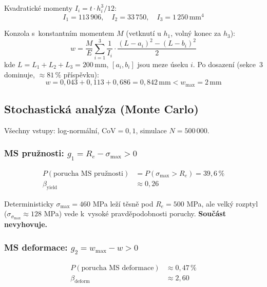 \documentclass[a4paper,11pt]{article}
\newcommand{\unit}[1]{\,\mathrm{#1}}
\begin{document}
Kvadratické momenty $I_i = t \cdot h_i^3 / 12$:
\begin{equation}
    I_1 = 113\,906, \quad I_2 = 33\,750, \quad I_3 = 1\,250\unit{mm^4}
\end{equation}

Konzola s~konstantním momentem $M$ (vetknutí u $h_1$, volný konec za $h_3$):
\begin{equation}
    w = \frac{M}{E} \sum_{i=1}^{3} \frac{1}{I_i} \cdot \frac{(L - a_i)^2 - (L - b_i)^2}{2}
\end{equation}
kde $L = L_1 + L_2 + L_3 = 200\unit{mm}$, $[a_i, b_i]$ jsou meze úseku $i$. Po dosazení (sekce~3 dominuje, $\approx 81\,\%$ příspěvku):
\begin{equation}
    w = 0{,}043 + 0{,}113 + 0{,}686 = \boxed{0{,}842\unit{mm}} < w_{\max} = 2\unit{mm}
\end{equation}

\subsection{Stochastická analýza (Monte Carlo)}

Všechny vstupy: log-normální, $\mathrm{CoV} = 0{,}1$, simulace $N = 500\,000$.

\subsubsection{MS pružnosti: $g_1 = R_e - \sigma_{\max} > 0$}

\begin{align}
    P(\text{porucha MS pružnosti}) &= P(\sigma_{\max} > R_e) = \boxed{39{,}6\,\%} \\
    \beta_{\mathrm{yield}} &\approx 0{,}26
\end{align}

Deterministicky $\sigma_{\max} = 460$ MPa leží těsně pod $R_e = 500$ MPa, ale velký rozptyl ($\sigma_{\sigma_{\max}} \approx 128$ MPa) vede k~vysoké pravděpodobnosti poruchy. \textbf{Součást nevyhovuje.}

\subsubsection{MS deformace: $g_2 = w_{\max} - w > 0$}

\begin{align}
    P(\text{porucha MS deformace}) &\approx \boxed{0{,}47\,\%} \\
    \beta_{\mathrm{deform}} &\approx 2{,}60
\end{align}
\end{document}
